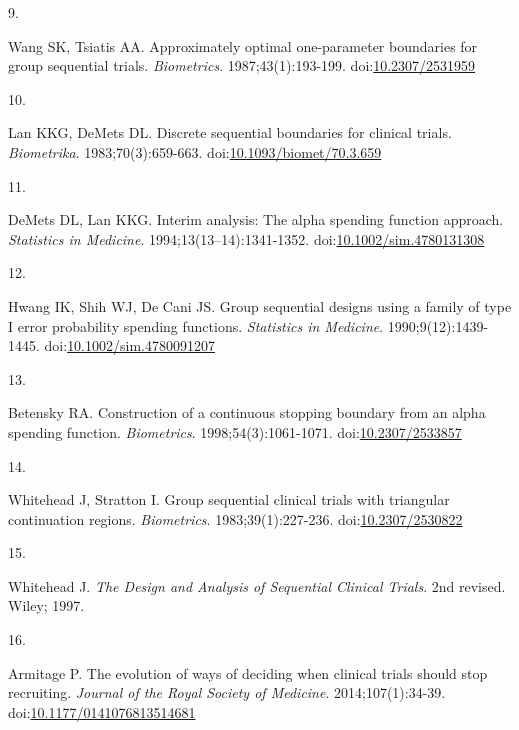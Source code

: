 \documentclass[
  11pt,
]{article}
\newlength{\cslhangindent}
\newlength{\csllabelwidth}
\newenvironment{CSLReferences}[2] %
 {\begin{list}{}{%
  \setlength{\itemindent}{0pt}
  \setlength{\leftmargin}{0pt}
  \setlength{\parsep}{0pt}
  \ifodd #1
   \setlength{\leftmargin}{\cslhangindent}
   \setlength{\itemindent}{-1\cslhangindent}
  \fi
  \setlength{\itemsep}{#2\baselineskip}}}
 {\end{list}}
\newcommand{\CSLLeftMargin}[1]{\parbox[t]{\csllabelwidth}{\strut#1\strut}}
\newcommand{\CSLRightInline}[1]{\parbox[t]{\linewidth - \csllabelwidth}{\strut#1\strut}}
\begin{document}
\begin{CSLReferences}{0}{1}
\CSLLeftMargin{9. }%
\CSLRightInline{Wang SK, Tsiatis AA. Approximately optimal one-parameter boundaries for group sequential trials. \emph{Biometrics}. 1987;43(1):193-199. doi:\href{https://doi.org/10.2307/2531959}{10.2307/2531959}}

\CSLLeftMargin{10. }%
\CSLRightInline{Lan KKG, DeMets DL. Discrete sequential boundaries for clinical trials. \emph{Biometrika}. 1983;70(3):659-663. doi:\href{https://doi.org/10.1093/biomet/70.3.659}{10.1093/biomet/70.3.659}}

\CSLLeftMargin{11. }%
\CSLRightInline{DeMets DL, Lan KKG. Interim analysis: The alpha spending function approach. \emph{Statistics in Medicine}. 1994;13(13--14):1341-1352. doi:\href{https://doi.org/10.1002/sim.4780131308}{10.1002/sim.4780131308}}

\CSLLeftMargin{12. }%
\CSLRightInline{Hwang IK, Shih WJ, De Cani JS. Group sequential designs using a family of type {I} error probability spending functions. \emph{Statistics in Medicine}. 1990;9(12):1439-1445. doi:\href{https://doi.org/10.1002/sim.4780091207}{10.1002/sim.4780091207}}

\CSLLeftMargin{13. }%
\CSLRightInline{Betensky RA. Construction of a continuous stopping boundary from an alpha spending function. \emph{Biometrics}. 1998;54(3):1061-1071. doi:\href{https://doi.org/10.2307/2533857}{10.2307/2533857}}

\CSLLeftMargin{14. }%
\CSLRightInline{Whitehead J, Stratton I. Group sequential clinical trials with triangular continuation regions. \emph{Biometrics}. 1983;39(1):227-236. doi:\href{https://doi.org/10.2307/2530822}{10.2307/2530822}}

\CSLLeftMargin{15. }%
\CSLRightInline{Whitehead J. \emph{The Design and Analysis of Sequential Clinical Trials}. 2nd revised. Wiley; 1997.}

\CSLLeftMargin{16. }%
\CSLRightInline{Armitage P. The evolution of ways of deciding when clinical trials should stop recruiting. \emph{Journal of the Royal Society of Medicine}. 2014;107(1):34-39. doi:\href{https://doi.org/10.1177/0141076813514681}{10.1177/0141076813514681}}


\end{CSLReferences}
\end{document}
